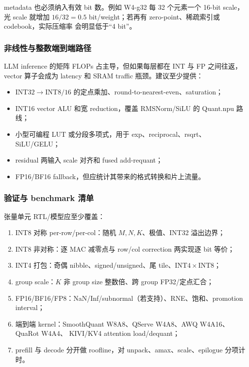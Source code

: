 metadata 也必须纳入有效 bit 数。例如 W4-g32 每 32 个元素一个 16-bit scale，光 scale
就增加 $16/32=0.5$ bit/weight；若再有 zero-point、稀疏索引或 codebook，实际压缩率
会明显低于“4 bit”。

\subsubsection{非线性与整数端到端路径}

LLM inference 的矩阵 FLOPs 占主导，但如果每层都在 INT 与 FP 之间往返，vector
算子会成为 latency 和 SRAM traffic 瓶颈。建议至少提供：
\begin{itemize}
  \item $\mathrm{INT32}\rightarrow\mathrm{INT8/16}$ 的定点乘加、round-to-nearest-even、saturation；
  \item INT16 vector ALU 和宽 reduction，覆盖 RMSNorm/SiLU 的 Quant.npu 路线；
  \item 小型可编程 LUT 或分段多项式，用于 exp、reciprocal、rsqrt、SiLU/GELU；
  \item residual 两输入 scale 对齐和 fused add-requant；
  \item FP16/BF16 fallback，但应统计其带来的格式转换和片上流量。
\end{itemize}

\subsubsection{验证与 benchmark 清单}

张量单元 RTL/模型应至少覆盖：
\begin{enumerate}
  \item INT8 对称 per-row/per-col：随机 $M,N,K$、极值、INT32 溢出边界；
  \item INT8 非对称：逐 MAC 减零点与 row/col correction 两实现逐 bit 等价；
  \item INT4 打包：奇偶 nibble、signed/unsigned、尾 tile、$\mathrm{INT4}\times\mathrm{INT8}$；
  \item group scale：$K$ 非 group size 整数倍、跨 group FP32/定点汇合；
  \item FP16/BF16/FP8：NaN/Inf/subnormal（若支持）、RNE、饱和、promotion interval；
  \item 端到端 kernel：SmoothQuant W8A8、QServe W4A8、AWQ W4A16、QuaRot W4A4、
  KIVI/KV4 attention load/dequant；
  \item prefill 与 decode 分开做 roofline，对 unpack、amax、scale、epilogue 分项计时。
\end{enumerate}

